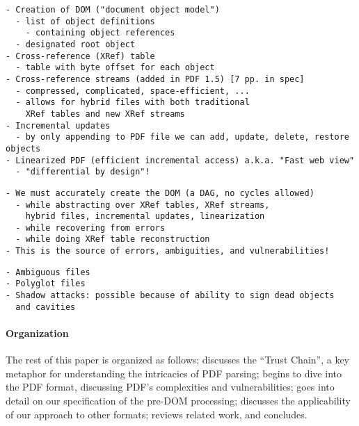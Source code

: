 \begin{lstlisting}[style=meta]
- Creation of DOM ("document object model")
  - list of object definitions
    - containing object references
  - designated root object
- Cross-reference (XRef) table
  - table with byte offset for each object
- Cross-reference streams (added in PDF 1.5) [7 pp. in spec]
  - compressed, complicated, space-efficient, ...
  - allows for hybrid files with both traditional
    XRef tables and new XRef streams
- Incremental updates
  - by only appending to PDF file we can add, update, delete, restore objects
- Linearized PDF (efficient incremental access) a.k.a. "Fast web view"
  - "differential by design"!
\end{lstlisting}
\begin{lstlisting}[style=meta]
- We must accurately create the DOM (a DAG, no cycles allowed)
  - while abstracting over XRef tables, XRef streams,
    hybrid files, incremental updates, linearization
  - while recovering from errors
  - while doing XRef table reconstruction
- This is the source of errors, ambiguities, and vulnerabilities!
\end{lstlisting}

\label{sec:pdf-vulnerabilities}
\begin{lstlisting}[style=meta]
- Ambiguous files
- Polyglot files
- Shadow attacks: possible because of ability to sign dead objects
  and cavities 
\end{lstlisting}

\paragraph*{Organization} The rest of this paper is organized as
follows;
%
 discusses the ``Trust Chain'', a key metaphor
for understanding the intricacies of PDF parsing;
 begins to dive into the PDF format, discussing PDF's
complexities and vulnerabilities;
 goes into detail on our specification of the pre-DOM processing;
 discusses the applicability of our approach to other formats;
%
 reviews related work, and %
 concludes.

